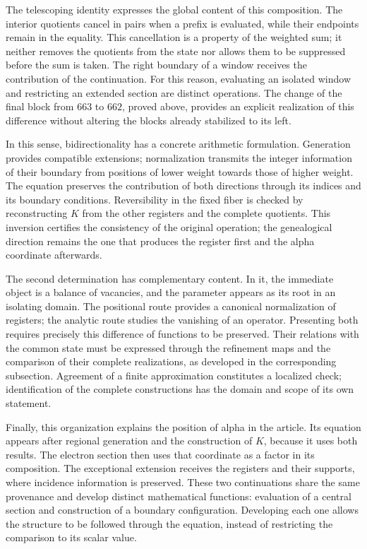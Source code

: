 The telescoping identity expresses the global content of this composition.
The interior quotients cancel in pairs when a prefix is evaluated,
while their endpoints remain in the equality. This cancellation is a
property of the weighted sum; it neither removes the quotients from the state nor
allows them to be suppressed before the sum is taken. The right boundary of a
window receives the contribution of the continuation. For this reason,
evaluating an isolated window and restricting an extended
section are distinct operations. The change of the final block from $663$ to
$662$, proved above, provides an explicit realization of this
difference without altering the blocks already stabilized to its left.

In this sense, bidirectionality has a concrete arithmetic
formulation. Generation provides compatible extensions;
normalization transmits the integer information of their boundary from
positions of lower weight towards those of higher weight. The equation preserves the
contribution of both directions through its indices and its boundary
conditions. Reversibility in the fixed fiber is checked by reconstructing
$K$ from the other registers and the complete quotients. This
inversion certifies the consistency of the original operation; the genealogical
direction remains the one that produces the register first and the alpha
coordinate afterwards.

The second determination has complementary content. In it, the
immediate object is a balance of vacancies, and the parameter appears as
its root in an isolating domain. The positional route provides a
canonical normalization of registers; the analytic route studies the vanishing
of an operator. Presenting both requires precisely this
difference of functions to be preserved. Their relations with the common state must be
expressed through the refinement maps and the comparison of
their complete realizations, as developed in the corresponding
subsection. Agreement of a finite approximation constitutes a
localized check; identification of the complete constructions
has the domain and scope of its own statement.

Finally, this organization explains the position of alpha in the article.
Its equation appears after regional generation and the construction
of $K$, because it uses both results. The electron section then uses
that coordinate as a factor in its composition. The exceptional
extension receives the registers and their supports, where incidence
information is preserved. These two continuations share the same
provenance and develop distinct mathematical functions: evaluation of
a central section and construction of a boundary configuration.
Developing each one allows the structure to be followed through the
equation, instead of restricting the comparison to its scalar value.
